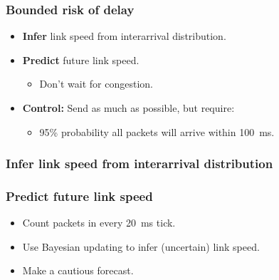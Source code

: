 \documentclass[svgnames]{beamer}
\begin{document}
\begin{frame}
\frametitle{Bounded risk of delay}
\begin{itemize}

\item \textbf{Infer} link speed from interarrival distribution.

\item \textbf{Predict} future link speed.

\begin{itemize}
\item Don't wait for congestion.
\end{itemize}

\item \textbf{Control:} Send as much as possible, but require:

\begin{itemize}

\item 95\% probability all packets will arrive within 100~ms.

\end{itemize}

\end{itemize}

\end{frame}

\begin{frame}
\frametitle{Infer link speed from interarrival distribution}

\def\svgwidth{0.7 \columnwidth}

\end{frame}

\begin{frame}
\frametitle{Predict future link speed}

\begin{itemize}
\item Count packets in every 20~ms tick.

\item Use Bayesian updating to infer (uncertain) link speed.

\item Make a cautious forecast.
\end{itemize}

\end{frame}

\begin{frame}

\begin{centering}
\def\svgwidth{0.85 \columnwidth}

\end{centering}

\end{frame}
\end{document}
